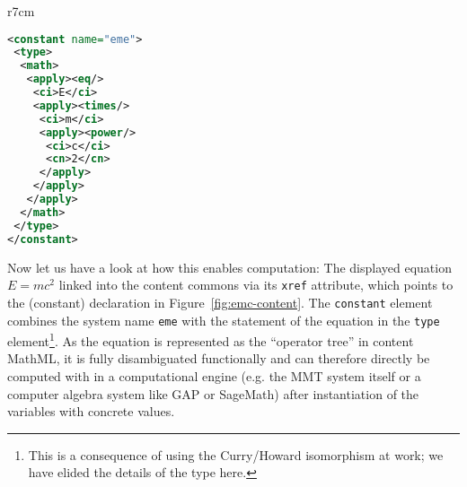 \begin{wrapfigure}r{7cm}\vspace*{-.5em}
\begin{lstlisting}[language=XML,morekeywords={constant,type,apply,math,ci,cn,csymbol},basicstyle=\footnotesize\sf]
<constant name="eme">
 <type>
  <math>
   <apply><eq/>
    <ci>E</ci>
    <apply><times/>
     <ci>m</ci>
     <apply><power/>
      <ci>c</ci>
      <cn>2</cn>
     </apply>
    </apply>
   </apply>
  </math>     
 </type>
</constant>
\end{lstlisting}
  \caption{$E=mc^2$ in Content MathML}\label{fig:emc-content}
\end{wrapfigure}
Now let us have a look at how this enables computation: The displayed equation $E=mc^2$
linked into the content commons via its \lstinline|xref| attribute, which points to the
(constant) declaration in Figure~\ref{fig:emc-content}. The \lstinline|constant| element
combines the system name \lstinline|eme| with the statement of the equation in the
\lstinline|type| element\footnote{This is a consequence of using the Curry/Howard
  isomorphism at work; we have elided the details of the type here.}. As the equation is
represented as the ``operator tree'' in content MathML, it is fully disambiguated
functionally and can therefore directly be computed with in a computational engine
(e.g. the MMT system itself or a computer algebra system like GAP or SageMath) after
instantiation of the variables with concrete values.



